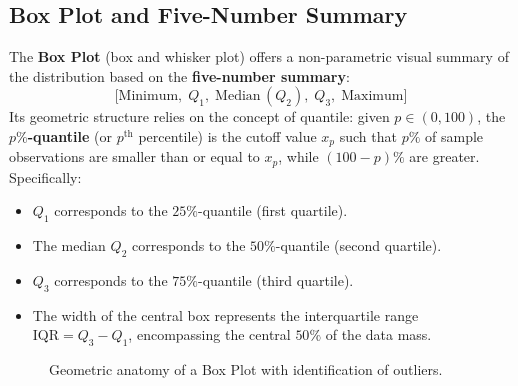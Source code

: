 \subsection{Box Plot and Five-Number Summary}
The \textbf{Box Plot} (box and whisker plot) offers a non-parametric visual summary of the distribution based on the \textbf{five-number summary}:
\[
\big[\text{Minimum}, \; Q_1, \; \text{Median} \, (Q_2), \; Q_3, \; \text{Maximum}\big]
\]
Its geometric structure relies on the concept of quantile: given $p \in (0, 100)$, the \textbf{$p\%$-quantile} (or $p^{\text{th}}$ percentile) is the cutoff value $x_p$ such that $p\%$ of sample observations are smaller than or equal to $x_p$, while $(100-p)\%$ are greater. Specifically:
\begin{itemize}
    \item $Q_1$ corresponds to the $25\%$-quantile (first quartile).
    \item The median $Q_2$ corresponds to the $50\%$-quantile (second quartile).
    \item $Q_3$ corresponds to the $75\%$-quantile (third quartile).
    \item The width of the central box represents the interquartile range $\text{IQR} = Q_3 - Q_1$, encompassing the central $50\%$ of the data mass.
\end{itemize}

\begin{figure}[H]
\centering
{}
\caption{Geometric anatomy of a Box Plot with identification of outliers.}
\label{fig:boxplot-anatomy}
\end{figure}


